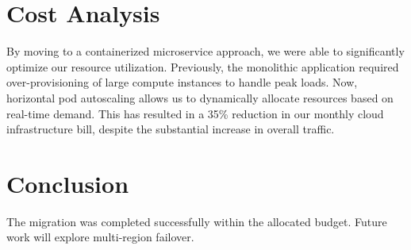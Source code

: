 \documentclass[10pt,a4paper]{article}
\begin{document}
\section{Cost Analysis}
By moving to a containerized microservice approach, we were able to significantly optimize our resource utilization. Previously, the monolithic application required over-provisioning of large compute instances to handle peak loads. Now, horizontal pod autoscaling allows us to dynamically allocate resources based on real-time demand. This has resulted in a 35\% reduction in our monthly cloud infrastructure bill, despite the substantial increase in overall traffic.

\section{Conclusion}
The migration was completed successfully within the allocated budget. Future work will explore multi-region failover.
\end{document}
